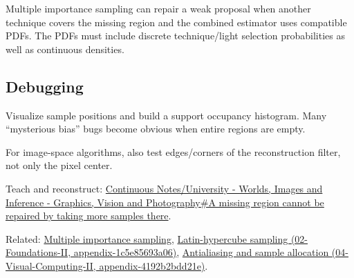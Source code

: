 Multiple importance sampling can repair a weak proposal when another technique covers the missing region and the combined estimator uses compatible PDFs. The PDFs must include discrete technique/light selection probabilities as well as continuous densities.

\subsection{Debugging}\label{debugging}

Visualize sample positions and build a support occupancy histogram. Many ``mysterious bias'' bugs become obvious when entire regions are empty.

For image-space algorithms, also test edges/corners of the reconstruction filter, not only the pixel center.

Teach and reconstruct: \href{Continuous\%20Notes/University\%20-\%20Worlds,\%20Images\%20and\%20Inference\%20-\%20Graphics,\%20Vision\%20and\%20Photography\#A\%20missing\%20region\%20cannot\%20be\%20repaired\%20by\%20taking\%20more\%20samples\%20there}{Continuous Notes/University - Worlds, Images and Inference - Graphics, Vision and Photography\#A missing region cannot be repaired by taking more samples there}.

Related: \hyperref[appendix-ca8898faf1a6]{Multiple importance sampling}, \href{}{Latin-hypercube sampling (02-Foundations-II, appendix-1c5e85693a06)}, \href{}{Antialiasing and sample allocation (04-Visual-Computing-II, appendix-4192b2bdd21e)}.
